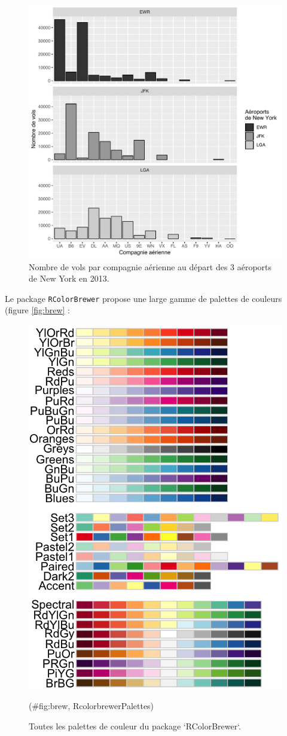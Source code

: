 \documentclass[a4paperpaper,]{article}
\begin{document}
\begin{figure}[htpb]

{\centering \includegraphics[width=0.9\linewidth]{figure/barfacetgray-1} 

}

\caption{Nombre de vols par compagnie aérienne au départ des 3 aéroports de New York en 2013.}\label{fig:barfacetgray}
\end{figure}

Le package \texttt{RColorBrewer} propose une large gamme de palettes de couleurs (figure \ref{fig:brew} :

\begin{figure}[htpb]

{\centering \includegraphics[width=0.5\linewidth]{images/brewer} 

}

\caption{Toutes les palettes de couleur du package `RColorBrewer`.}(\#fig:brew, RcolorbrewerPalettes)
\end{figure}
\end{document}
